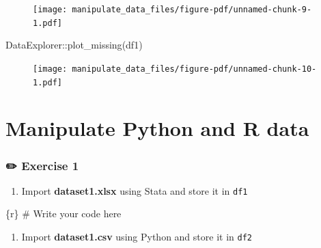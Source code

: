 \documentclass[
  letterpaper,
  DIV=11,
  numbers=noendperiod,
  oneside]{scrreprt}
\newenvironment{Shaded}{\begin{snugshade}}{\end{snugshade}}
\newcommand{\CommentTok}[1]{\textcolor[rgb]{0.37,0.37,0.37}{#1}}
\newcommand{\FunctionTok}[1]{\textcolor[rgb]{0.28,0.35,0.67}{#1}}
\newcommand{\InformationTok}[1]{\textcolor[rgb]{0.37,0.37,0.37}{#1}}
\newcommand{\NormalTok}[1]{\textcolor[rgb]{0.00,0.23,0.31}{#1}}
\newcommand{\SpecialCharTok}[1]{\textcolor[rgb]{0.37,0.37,0.37}{#1}}
\providecommand{\tightlist}{%
  \setlength{\itemsep}{0pt}\setlength{\parskip}{0pt}}\usepackage{longtable,booktabs,array}
\begin{document}
\begin{figure}[H]

{\centering \texttt{[image: manipulate\_data\_files/figure-pdf/unnamed-chunk-9-1.pdf]}

}

\end{figure}

\begin{Shaded}
\begin{Highlighting}[]
\NormalTok{DataExplorer}\SpecialCharTok{::}\FunctionTok{plot\_missing}\NormalTok{(df1)}
\end{Highlighting}
\end{Shaded}

\begin{figure}[H]

{\centering \texttt{[image: manipulate\_data\_files/figure-pdf/unnamed-chunk-10-1.pdf]}

}

\end{figure}

\hypertarget{manipulate-python-and-r-data}{%
\section{Manipulate Python and R
data}\label{manipulate-python-and-r-data}}

\subsubsection{\texorpdfstring{{✏️} Exercise 1}{✏️ Exercise 1}}

\begin{enumerate}
\def\labelenumi{\arabic{enumi}.}
\tightlist
\item
  Import \textbf{dataset1.xlsx} using Stata and store it in \texttt{df1}
\end{enumerate}

\begin{Shaded}
\begin{Highlighting}[]
\InformationTok{\textasciigrave{}\textasciigrave{}\textasciigrave{}\{r\}}
\CommentTok{\# Write your code here}
\InformationTok{\textasciigrave{}\textasciigrave{}\textasciigrave{}}
\end{Highlighting}
\end{Shaded}

\begin{enumerate}
\def\labelenumi{\arabic{enumi}.}
\setcounter{enumi}{1}
\tightlist
\item
  Import \textbf{dataset1.csv} using Python and store it in \texttt{df2}
\end{enumerate}
\end{document}
